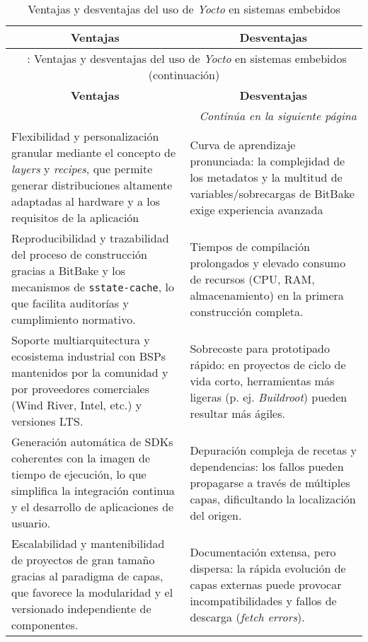 \begin{longtable}{p{7.5cm}|p{7.5cm}}
    \caption{Ventajas y desventajas del uso de \textit{Yocto} en sistemas embebidos} \label{tab:yocto_pros_cons} \\
    \hline
    \multicolumn{1}{c|}{\textbf{Ventajas}} & \multicolumn{1}{c}{\textbf{Desventajas}} \\
    \hline
    \endfirsthead
    
    \multicolumn{2}{c}{\tablename\ \thetable{}: Ventajas y desventajas del uso de \textit{Yocto} en sistemas embebidos (continuación)} \\
    \hline
    \multicolumn{1}{c|}{\textbf{Ventajas}} & \multicolumn{1}{c}{\textbf{Desventajas}} \\
    \hline
    \endhead
    
    \hline
    \multicolumn{2}{r}{\textit{Continúa en la siguiente página}} \\
    \endfoot
    
    \hline
    \endlastfoot
    
    Flexibilidad y personalización granular mediante el concepto de \textit{layers} y \textit{recipes}, que permite generar distribuciones altamente adaptadas al hardware y a los requisitos de la aplicación & Curva de aprendizaje pronunciada: la complejidad de los metadatos y la multitud de variables/sobrecargas de BitBake exige experiencia avanzada \\ 
    \hline
    
    Reproducibilidad y trazabilidad del proceso de construcción gracias a BitBake y los mecanismos de \texttt{sstate‑cache}, lo que facilita auditorías y cumplimiento normativo. & Tiempos de compilación prolongados y elevado consumo de recursos (CPU, RAM, almacenamiento) en la primera construcción completa. \\
    \hline

    Soporte multiarquitectura y ecosistema industrial con BSPs mantenidos por la comunidad y por proveedores comerciales (Wind River, Intel, etc.) y versiones LTS. & Sobrecoste para prototipado rápido: en proyectos de ciclo de vida corto, herramientas más ligeras (p. ej. \textit{Buildroot}) pueden resultar más ágiles.\\
    \hline

    Generación automática de SDKs coherentes con la imagen de tiempo de ejecución, lo que simplifica la integración continua y el desarrollo de aplicaciones de usuario. & Depuración compleja de recetas y dependencias: los fallos pueden propagarse a través de múltiples capas, dificultando la localización del origen.\\
    \hline

    Escalabilidad y mantenibilidad de proyectos de gran tamaño gracias al paradigma de capas, que favorece la modularidad y el versionado independiente de componentes. & Documentación extensa, pero dispersa: la rápida evolución de capas externas puede provocar incompatibilidades y fallos de descarga (\textit{fetch errors}).
\end{longtable}
